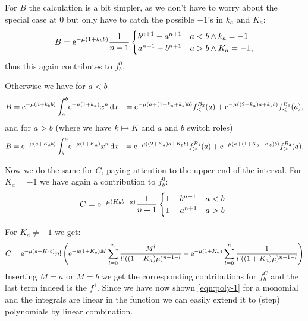 \begin{Lemma}
\begin{Proof}
    For $B$ the calculation is a bit simpler, as we don't have to worry about
    the special case at 0 but only have to catch the possible $-1$'s in $k_a$
    and $K_a$:
    \begin{align*}
      B = \Eto{-\mu(1 + k_b b)} \frac{1}{n+1} \begin{cases}
        b^{n+1} - a^{n+1} & a<b \wedge k_a = -1 \\
        a^{n+1} - b^{n+1} & a>b \wedge K_a = -1,
      \end{cases}
    \end{align*}
    thus this again contributes to $f^0_b$.

    Otherwise we have for $a < b$
    \begin{align*}
      B &= \Eto{-\mu(a + k_b b)} \Integ[b]{a}{x}{\Eto{-\mu(1+k_a)}x^n}
        &= \Eto{-\mu(a + (1+k_a+k_b)b)} f^{B_2}_<(a)
         + \Eto{-\mu((2+k_a)a +k_b b)} f^{B_1}_<(a),
    \end{align*}
    and for $a > b$ (where we have $k\mapsto K$ and $a$ and $b$ switch roles)
    \begin{align*}
      B &= \Eto{-\mu(a + K_b b)} \Integ[a]{b}{x}{\Eto{-\mu(1+K_a)}x^n}
        &= \Eto{-\mu((2+K_a)a + K_b b)} f^{B_1}_>(a)
         + \Eto{-\mu(a + (1+K_a+K_b)b)} f^{B_2}_>(a).
    \end{align*}

    Now we do the same for $C$, paying attention to the upper end of the
    interval. For $K_a = -1$ we have again a contribution to $f^0_b$:
    \begin{align*}
      C = \Eto{-\mu(K_b b - a)} \frac{1}{n+1} \begin{cases}
        1 - b^{n+1} & a < b \\
        1 - a^{n+1} & a > b
      \end{cases}.
    \end{align*}

    For $K_a \neq -1$ we get:
    \begin{align*}
      C = \Eto{-\mu(a+K_b b)} n! \left(
      \Eto{-\mu(1+K_a)M} \sum_{l=0}^n \frac{M^l}{l!((1+K_a)\mu)^{n+1-l}}
      - \Eto{-\mu(1+K_a)} \sum_{l=0}^n \frac{1}{l!((1+K_a)\mu)^{n+1-l}}
      \right)
    \end{align*}
    Inserting $M=a$ or $M=b$ we get the corresponding contributions for $f^C_b$
    and the last term indeed is the $f^1$. Since we have now shown
    \eqref{eqn:poly-1} for a monomial and the integrals are linear in the
    function we can easily extend it to (step) polynomials by linear
    combination.
    

\end{Proof}
\end{Lemma}
